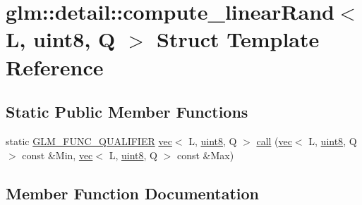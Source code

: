 \hypertarget{structglm_1_1detail_1_1compute__linear_rand_3_01_l_00_01uint8_00_01_q_01_4}{}\section{glm\+:\+:detail\+:\+:compute\+\_\+linear\+Rand$<$ L, uint8, Q $>$ Struct Template Reference}
\label{structglm_1_1detail_1_1compute__linear_rand_3_01_l_00_01uint8_00_01_q_01_4}
\subsection*{Static Public Member Functions}
\begin{DoxyCompactItemize}
\item 
static \hyperlink{setup_8hpp_a33fdea6f91c5f834105f7415e2a64407}{G\+L\+M\+\_\+\+F\+U\+N\+C\+\_\+\+Q\+U\+A\+L\+I\+F\+I\+ER} \hyperlink{structglm_1_1vec}{vec}$<$ L, \hyperlink{namespaceglm_1_1detail_aef2588f97d090cc19fbbe0c74fe17c8f}{uint8}, Q $>$ \hyperlink{structglm_1_1detail_1_1compute__linear_rand_3_01_l_00_01uint8_00_01_q_01_4_a4eabc0e8296fcd79054e1057ff7a06f7}{call} (\hyperlink{structglm_1_1vec}{vec}$<$ L, \hyperlink{namespaceglm_1_1detail_aef2588f97d090cc19fbbe0c74fe17c8f}{uint8}, Q $>$ const \&Min, \hyperlink{structglm_1_1vec}{vec}$<$ L, \hyperlink{namespaceglm_1_1detail_aef2588f97d090cc19fbbe0c74fe17c8f}{uint8}, Q $>$ const \&Max)
\end{DoxyCompactItemize}


\subsection{Member Function Documentation}
\mbox{\label{structglm_1_1detail_1_1compute__linear_rand_3_01_l_00_01uint8_00_01_q_01_4_a4eabc0e8296fcd79054e1057ff7a06f7}} 
